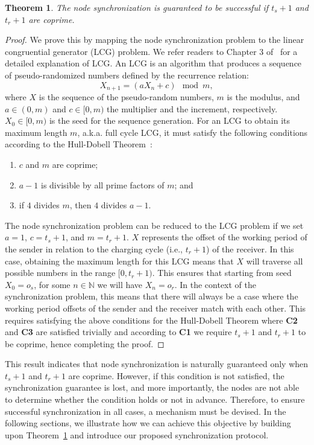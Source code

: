 \documentclass[lettersize,journal]{IEEEtran}
\newtheorem{theorem}{Theorem}
\begin{document}
\begin{theorem}
\label{thm:motivation:coprime}
    The node synchronization is guaranteed to be successful if $t_s+1$ and $t_r+1$ are coprime. 
\end{theorem}
\begin{proof}
    We prove this by mapping the node synchronization problem to the linear congruential generator (LCG) problem. We refer readers to Chapter 3 of~\cite{1997-art-lcg} for a detailed explanation of LCG. An LCG is an algorithm that produces a sequence of pseudo-randomized numbers defined by the recurrence relation:
    \begin{equation}
        X_{n+1} = (aX_n + c) \mod m,
    \end{equation}
    where $X$ is the sequence of the pseudo-random numbers, $m$ is the modulus, and $a \in (0,m)$ and $c \in [0,m)$ the multiplier and the increment, respectively. $X_0 \in [0,m)$ is the seed for the sequence generation. For an LCG to obtain its maximum length $m$, a.k.a. full cycle LCG, it must satisfy the following conditions according to the Hull-Dobell Theorem~\cite{1962-siam-generator}:
    \begin{enumerate}[label={\textbf{C\arabic*:}}]
        \item $c$ and $m$ are coprime;
        \item $a-1$ is divisible by all prime factors of $m$; and
        \item if $4$ divides $m$, then $4$ divides $a-1$. 
    \end{enumerate}
    The node synchronization problem can be reduced to the LCG problem if we set $a=1$, $c = t_s+1$, and $m=t_r + 1$. $X$ represents the offset of the working period of the sender in relation to the charging cycle (i.e., $t_r+1$) of the receiver. In this case, obtaining the maximum length for this LCG means that $X$ will traverse all possible numbers in the range $[0, t_r+1)$. This ensures that starting from seed $X_0 = o_s$, for some $n \in \mathbb{N}$ we will have $X_n = o_r$. In the context of the synchronization problem, this means that there will always be a case where the working period offsets of the sender and the receiver match with each other. This requires satisfying the above conditions for the Hull-Dobell Theorem where \textbf{C2} and \textbf{C3} are satisfied trivially and according to \textbf{C1} we require $t_s+1$ and $t_r+1$ to be coprime, hence completing the proof.
\end{proof}

This result indicates that node synchronization is naturally guaranteed only when $t_s+1$ and $t_r+1$ are coprime. However, if this condition is not satisfied, the synchronization guarantee is lost, and more importantly, the nodes are not able to determine whether the condition holds or not in advance. Therefore, to ensure successful synchronization in all cases, a mechanism must be devised. In the following sections, we illustrate how we can achieve this objective by building upon Theorem~\ref{thm:motivation:coprime} and introduce our proposed synchronization protocol.
\end{document}
